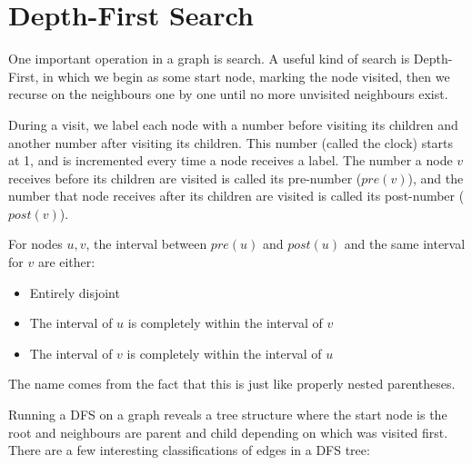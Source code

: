 \chapter{Depth-First Search}

One important operation in a graph is search.  A useful kind of search
is Depth-First, in which we begin as some start node, marking the node
visited, then we recurse on the neighbours one by one until no more
unvisited neighbours exist.

During a visit, we label each node with a number before visiting its
children and another number after visiting its children.  This number
(called the clock) starts at 1, and is incremented every time a node
receives a label.  The number a node $v$ receives before its children
are visited is called its pre-number ($pre(v)$), and the number that
node receives after its children are visited is called its post-number
($post(v)$).

\begin{theorem}

For nodes $u,v$, the interval between $pre(u)$ and $post(u)$ and the
same interval for $v$ are either:

\begin{itemize}

\item Entirely disjoint
\item The interval of $u$ is completely within the interval of $v$
\item The interval of $v$ is completely within the interval of $u$

\end{itemize}

The name comes from the fact that this is just like properly nested
parentheses.

\end{theorem}

Running a DFS on a graph reveals a tree structure where the start node
is the root and neighbours are parent and child depending on which was
visited first.  There are a few interesting classifications of edges
in a DFS tree:

